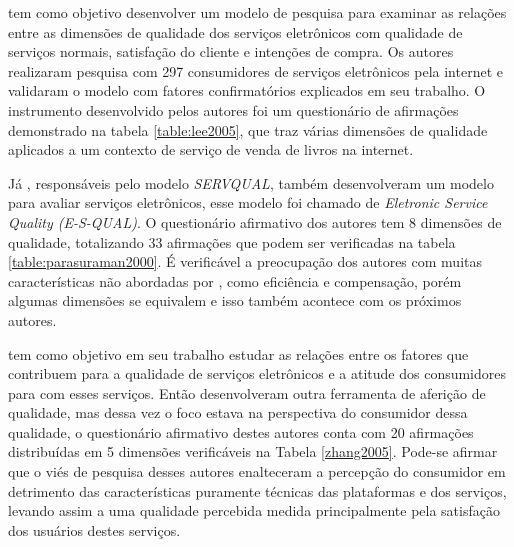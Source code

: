 \cite{lee2005} tem como objetivo desenvolver um modelo de pesquisa para examinar as relações entre as dimensões de qualidade dos serviços eletrônicos com qualidade de serviços normais, satisfação do cliente e intenções de compra. Os autores realizaram pesquisa com 297 consumidores de serviços eletrônicos pela internet e validaram o modelo com fatores confirmatórios explicados em seu trabalho. O instrumento desenvolvido pelos autores foi um questionário de afirmações demonstrado na tabela \ref{table:lee2005}, que traz várias dimensões de qualidade aplicados a um contexto de serviço de venda de livros na internet.

Já \cite{parasuraman2000}, responsáveis pelo modelo \textit{SERVQUAL}, também desenvolveram um modelo para avaliar serviços eletrônicos, esse modelo foi chamado de \textit{Eletronic Service Quality (E-S-QUAL)}. O questionário afirmativo dos autores tem 8 dimensões de qualidade, totalizando 33 afirmações que podem ser verificadas na tabela \ref{table:parasuraman2000}. É verificável a preocupação dos autores com muitas características não abordadas por \cite{lee2005}, como eficiência e compensação, porém algumas dimensões se equivalem e isso também acontece com os próximos autores.

\cite{zhang2005} tem como objetivo em seu trabalho estudar as relações entre os fatores que contribuem para a qualidade de serviços eletrônicos e a atitude dos consumidores para com esses serviços. Então desenvolveram outra ferramenta de aferição de qualidade, mas dessa vez o foco estava na perspectiva do consumidor dessa qualidade, o questionário afirmativo destes autores conta com 20 afirmações distribuídas em 5 dimensões verificáveis na Tabela \ref{zhang2005}. Pode-se afirmar que o viés de pesquisa desses autores enalteceram a percepção do consumidor em detrimento das características puramente técnicas das plataformas e dos serviços, levando assim a uma qualidade percebida medida principalmente pela satisfação dos usuários destes serviços.
